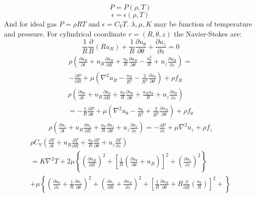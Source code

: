 \documentclass[12pt, a4paper]{article}
\begin{document}
\begin{equation}
    P=P(\rho,T)
\end{equation}
\begin{equation}
    \epsilon=\epsilon(\rho,T)
\end{equation}
And for ideal gas $P=\rho R T$ and $\epsilon=C_V T$.
$\lambda, \mu, K$ may be function of temperature and pressure.
For cylindrical coordinate $r=(R,\theta,z)$ the Navier-Stokes are:
\begin{equation}
    \frac{1}{R}\frac{\partial}{R}(R u_R)+\frac{1}{R}\frac{\partial u_\theta}{\partial \theta}+\frac{\partial u_z}{\partial z} = 0
\end{equation} 
\begin{multline}
    \rho\left( \frac{\partial u_R}{\partial t} + u_R\frac{\partial u_R}{\partial R} + \frac{u_\theta}{R}\frac{\partial u_R}{\partial \theta}
    -\frac{u_\theta^2}{R}+u_z\frac{\partial u_R}{\partial z} \right) = \\
    -\frac{\partial P}{\partial R} + \mu\left( \nabla^2u_R-\frac{u_R}{R^2}-\frac{2}{R^2} \frac{\partial u_\theta}{\partial \theta} \right) + \rho f_R
\end{multline}
\begin{multline}
    \rho \left( \frac{\partial u_\theta}{\partial t}+u_R\frac{\partial u_\theta}{\partial R} + \frac{u_\theta}{R}\frac{\partial u_\theta}{\partial \theta} + \frac{u_R u_\theta}{R}+u_z\frac{\partial u_\theta}{\partial z} \right) \\ 
    = -\frac{1}{R}\frac{\partial P}{\partial \theta}+\mu \left( \nabla^2 u_\theta -\frac{u_\theta}{R^2} + \frac{2}{R^2}\frac{\partial u_R}{\partial \theta} \right) + \rho f_\theta
\end{multline}
\begin{multline}
    \rho\left(\frac{\partial u_z}{\partial t}+u_R\frac{\partial u_z}{\partial R}+\frac{u_\theta}{R}\frac{\partial u_z}{\partial \theta}+u_z\frac{\partial u_z}{\partial z} \right) = -\frac{\partial P}{\partial z} + \mu \nabla^2u_z+\rho f_z
\end{multline}
\begin{multline}
    \rho C_V\left(\frac{\partial T}{\partial t}+u_R\frac{\partial T}{\partial R}+\frac{u_\theta}{R}\frac{\partial T}{\partial \theta}+u_z\frac{\partial T}{\partial z} \right) \\
    =K\nabla^2 T+2\mu \left\{ \left(\frac{\partial u_R}{\partial R} \right)^2+\left[\frac{1}{R}\left(\frac{\partial u_\theta}{\partial \theta}+u_R\right) \right]^2+\left(\frac{\partial u_z}{\partial z}\right)^2 \right\} \\
    +\mu\left\{
        \left(\frac{\partial u_\theta}{\partial z}+\frac{1}{R}\frac{\partial u_z}{\partial \theta}\right)^2 +
        \left(\frac{\partial u_z}{\partial R}+\frac{\partial u_R}{\partial z}\right)^2 +
        \left[\frac{1}{R}\frac{\partial u_R}{\partial \theta}+R\frac{\partial}{\partial R}\left(\frac{u_\theta}{R}\right) \right]^2 +    
    \right\}
\end{multline}
\end{document}
